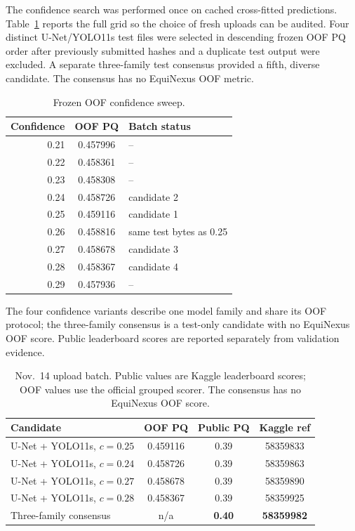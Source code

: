 \documentclass[sigconf]{acmart}
\begin{document}
The confidence search was performed once on cached cross-fitted predictions. Table~\ref{tab:sweep} reports the full grid so the choice of fresh uploads can be audited. Four distinct U-Net/YOLO11s test files were selected in descending frozen OOF PQ order after previously submitted hashes and a duplicate test output were excluded. A separate three-family test consensus provided a fifth, diverse candidate. The consensus has no EquiNexus OOF metric.

\begin{table}[t]
\centering
\caption{Frozen OOF confidence sweep.}
\label{tab:sweep}
\small
\begin{tabular}{rcl}
\toprule
Confidence & OOF PQ & Batch status \\
\midrule
0.21 & 0.457996 & -- \\
0.22 & 0.458361 & -- \\
0.23 & 0.458308 & -- \\
0.24 & 0.458726 & candidate 2 \\
0.25 & 0.459116 & candidate 1 \\
0.26 & 0.458816 & same test bytes as 0.25 \\
0.27 & 0.458678 & candidate 3 \\
0.28 & 0.458367 & candidate 4 \\
0.29 & 0.457936 & -- \\
\bottomrule
\end{tabular}
\end{table}

The four confidence variants describe one model family and share its OOF protocol; the three-family consensus is a test-only candidate with no EquiNexus OOF score. Public leaderboard scores are reported separately from validation evidence.

\begin{table}[t]
\centering
\caption{Nov.~14 upload batch. Public values are Kaggle leaderboard scores; OOF values use the official grouped scorer. The consensus has no EquiNexus OOF score.}
\label{tab:submissions}
\small
\begin{tabularx}{\columnwidth}{Xccc}
\toprule
Candidate & OOF PQ & Public PQ & Kaggle ref \\
\midrule
U-Net + YOLO11s, $c=0.25$ & 0.459116 & 0.39 & 58359833 \\
U-Net + YOLO11s, $c=0.24$ & 0.458726 & 0.39 & 58359863 \\
U-Net + YOLO11s, $c=0.27$ & 0.458678 & 0.39 & 58359890 \\
U-Net + YOLO11s, $c=0.28$ & 0.458367 & 0.39 & 58359925 \\
Three-family consensus & n/a & \textbf{0.40} & \textbf{58359982} \\
\bottomrule
\end{tabularx}
\end{table}
\end{document}
